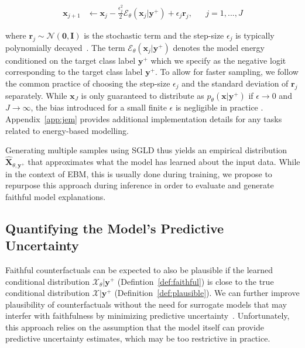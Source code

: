 \begin{equation}\label{eq:sgld}
  \begin{aligned}
    \mathbf{x}_{j+1} &\leftarrow \mathbf{x}_j - \frac{\epsilon_j^2}{2} \mathcal{E}_{\theta}(\mathbf{x}_j|\mathbf{y}^+) + \epsilon_j \mathbf{r}_j, && j=1,...,J
  \end{aligned}
\end{equation}

where $\mathbf{r}_j \sim \mathcal{N}(\mathbf{0},\mathbf{I})$ is the stochastic term and the step-size $\epsilon_j$ is typically polynomially decayed~\citep{welling2011bayesian}. The term $\mathcal{E}_{\theta}(\mathbf{x}_j|\mathbf{y}^+)$ denotes the model energy conditioned on the target class label $\mathbf{y}^+$ which we specify as the negative logit corresponding to the target class label $\mathbf{y}^{+}$. To allow for faster sampling, we follow the common practice of choosing the step-size $\epsilon_j$ and the standard deviation of $\mathbf{r}_j$ separately. While $\mathbf{x}_J$ is only guaranteed to distribute as $p_{\theta}(\mathbf{x}|\mathbf{y}^{+})$ if $\epsilon \rightarrow 0$ and $J \rightarrow \infty$, the bias introduced for a small finite $\epsilon$ is negligible in practice \citep{murphy2023probabilistic,grathwohl2020your}. Appendix~\ref{app:jem} provides additional implementation details for any tasks related to energy-based modelling. 

Generating multiple samples using SGLD thus yields an empirical distribution $\widehat{\mathbf{X}}_{\theta,\mathbf{y}^+}$ that approximates what the model has learned about the input data. While in the context of EBM, this is usually done during training, we propose to repurpose this approach during inference in order to evaluate and generate faithful model explanations.

\subsection{Quantifying the Model's Predictive Uncertainty}

Faithful counterfactuals can be expected to also be plausible if the learned conditional distribution $\mathcal{X}_{\theta}|\mathbf{y}^+$ (Defintion~\ref{def:faithful}) is close to the true conditional distribution $\mathcal{X}|\mathbf{y}^+$ (Definition~\ref{def:plausible}). We can further improve plausibility of counterfactuals without the need for surrogate models that may interfer with faithfulness by minimizing predictive uncertainty~\citep{schut2021generating}.
Unfortunately, this approach relies on the assumption that the model itself can provide predictive uncertainty estimates, which may be too restrictive in practice. 

